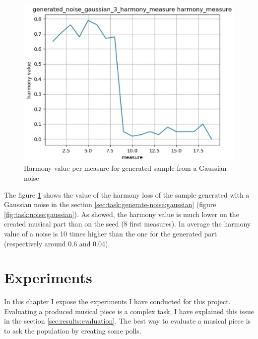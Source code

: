 \documentclass[12pt]{report}
\begin{document}
\begin{figure}[htbp]
    \centering
    \includegraphics[width=\textwidth]{images/generated_midis/tasks/generate-noise/generate-noise-gaussian-harmony.jpg}
    \caption{Harmony value per measure for generated sample from a Gaussian noise}
    \label{fig:task:noise:gaussian-harmony}
\end{figure}

The figure \ref{fig:task:noise:gaussian-harmony} shows the value of the harmony loss of the sample generated with a Gaussian noise in the section \ref{sec:task:generate-noise:gaussian} (figure \ref{fig:task:noise:gaussian}).
As showed, the harmony value is much lower on the created musical part than on the seed (8 first measures).
In average the harmony value of a noise is 10 times higher than the one for the generated part (respectively around $0.6$ and $0.04$).


\chapter{Experiments}
\label{chap:experiments}

In this chapter I expose the experiments I have conducted for this project.
Evaluating a produced musical piece is a complex task, I have explained this issue in the section \ref{sec:results:evaluation}.
The best way to evaluate a musical piece is to ask the population by creating some polls.
\end{document}
